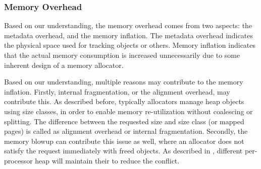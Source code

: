 

\begin{comment}
Can we integrate the cache misses or page faults for each allocation and deallocation, so that we could identify the issue of DieHarder that invokes many unnecessary cache misses?

If we could correlate cache misses to each thread, then we could do this. 

If allocation and deallocation takes too much time, it could be caused by multiple reasons:

(1) First, it just takes a lot of instructions (could we find out the lapsed instructions for each thread?)
(2) It may be caused by not good algorithm? 
(3) It can be caused by lock contention?
(4) It can be caused by system call related contention?
\end{comment} 

\subsubsection{Memory Overhead}

Based on our understanding, the memory overhead comes from two aspects: the metadata overhead, and the memory inflation. The metadata overhead indicates the physical space used for tracking objects or others. Memory inflation indicates that the actual memory consumption is increased unnecessarily due to some inherent design of a memory allocator. 

Based on our understanding, multiple reasons may contribute to the memory inflation.  Firstly, internal fragmentation, or the alignment overhead, may contribute this. As described before, typically allocators manage heap objects using size classes, in order to enable  memory re-utilization without coalescing or splitting. The difference between the requested size and size class (or mapped pages) is called as alignment overhead or internal fragmentation. Secondly, the memory blowup can contribute this issue as well, where an allocator does not satisfy the request immediately with freed objects. As described in , different per-processor heap will maintain their to reduce the conflict.   

